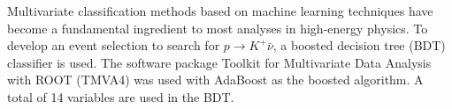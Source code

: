 Multivariate classification methods based on machine learning techniques have become a fundamental ingredient to most analyses in high-energy physics. 
To develop an event selection to search for $p\rightarrow K^{+} \bar{\nu}$, a boosted decision tree (BDT) classifier is used. The software package Toolkit for Multivariate Data Analysis with ROOT (TMVA4)
\cite{tmva}
was used with AdaBoost as the boosted algorithm. A total of 14 variables are used in the BDT.  
